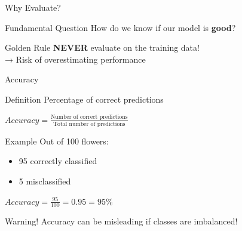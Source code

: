 \documentclass[aspectratio=169]{beamer}
\begin{document}
\begin{frame}{Why Evaluate?}
\begin{block}{Fundamental Question}
How do we know if our model is \textbf{good}?
\end{block}

\vspace{0.5cm}
\begin{alertblock}{Golden Rule}
\textbf{NEVER} evaluate on the training data!\\
→ Risk of overestimating performance
\end{alertblock}

\vspace{0.5cm}
\begin{center}
\end{center}
\end{frame}

\begin{frame}{Accuracy}
\begin{block}{Definition}
Percentage of correct predictions
\end{block}

\begin{center}
\Large
$Accuracy = \frac{\text{Number of correct predictions}}{\text{Total number of predictions}}$
\end{center}

\vspace{0.3cm}
\begin{exampleblock}{Example}
Out of 100 flowers:
\begin{itemize}
    \item 95 correctly classified
    \item 5 misclassified
\end{itemize}
$Accuracy = \frac{95}{100} = 0.95 = 95\%$
\end{exampleblock}

\vspace{0.3cm}
\begin{alertblock}{Warning!}
Accuracy can be misleading if classes are imbalanced!
\end{alertblock}
\end{frame}
\end{document}
